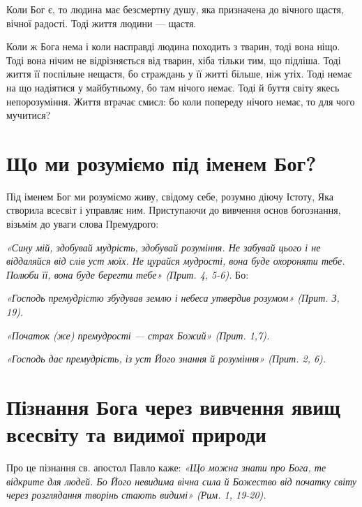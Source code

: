 \documentclass[main.tex]{subfiles}
\begin{document}
Коли Бог є, то людина має безсмертну душу, яка призначена до вічного щастя, вічної радості. Тоді життя людини — щастя.

Коли ж Бога нема і коли насправді людина походить з тварин, тоді вона ніщо. Тоді вона нічим не відрізняється від тварин, хіба тільки тим, що підліша. Тоді життя її поспільне нещастя, бо страждань у її житті більше, ніж утіх. Тоді немає на що надіятися у майбутньому, бо там нічого немає. Тоді й буття світу якесь непорозуміння. Життя втрачає смисл: бо коли попереду нічого немає, то для чого мучитися?

\section{Що ми розуміємо під іменем Бог?}

Під іменем Бог ми розуміємо живу, свідому себе, розумно діючу Істоту, Яка створила всесвіт і управляє ним.
Приступаючи до вивчення основ богознання, візьмім до уваги слова Премудрого:

\begin{FlushRight}
    \emph{«Сину мій, здобувай мудрість, здобувай розуміння. Не забувай цього і не віддаляйся від слів уст моїх. Не цурайся мудрості, вона буде охороняти тебе. Полюби її, вона буде берегти тебе» (Прит. 4, 5-6).} Бо:
\end{FlushRight}

\begin{FlushRight}
    \emph{«Господь премудрістю збудував землю і небеса утвердив розумом» (Прит. З, 19).}
\end{FlushRight}

\begin{FlushRight}
    \emph{«Початок (же) премудрості — страх Божий» (Прит. 1,7).}
\end{FlushRight}

\begin{FlushRight}
    \emph{«Господь дає премудрість, із уст Його знання й розуміння» (Прит. 2, 6).}
\end{FlushRight}

\section{Пізнання Бога через вивчення явищ всесвіту та видимої природи}

Про це пізнання св. апостол Павло каже: \emph{«Що можна знати про Бога, те відкрите для людей. Бо Його невидима вічна сила й Божество від початку світу через розглядання творінь стають видимі» (Рим. 1, 19-20).}
 
\end{document}
